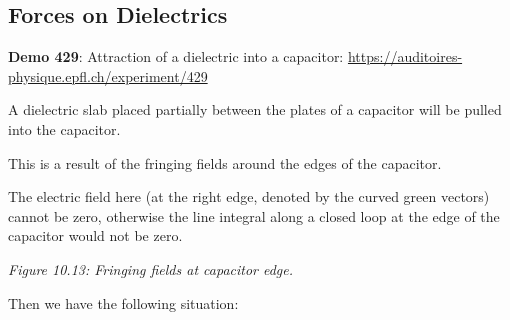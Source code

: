 \subsection{Forces on Dielectrics}

\begin{remark}
\textbf{Demo 429}: Attraction of a dielectric into a capacitor: \url{https://auditoires-physique.epfl.ch/experiment/429}
\end{remark}

A dielectric slab placed partially between the plates of a capacitor will be pulled into the capacitor.

\noindent
\begin{minipage}{0.55\textwidth}
This is a result of the fringing fields around the edges of the capacitor.

The electric field here (at the right edge, denoted by the curved green vectors) cannot be zero, otherwise the line integral along a closed loop at the edge of the capacitor would not be zero.
\end{minipage}
\hfill
\begin{minipage}{0.4\textwidth}
\centering
{}
\par\smallskip\small\textit{Figure 10.13: Fringing fields at capacitor edge.}
\end{minipage}

\vspace{0.8em}
Then we have the following situation:

